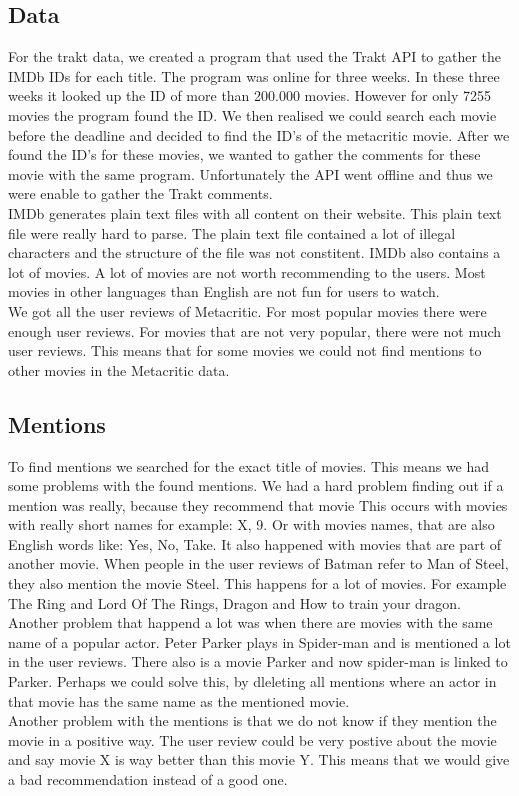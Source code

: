 \subsection{Data}
For the trakt data, we created a program that used the Trakt API to gather the IMDb IDs for each title.
The program was online for three weeks. 
In these three weeks it looked up the ID of more than 200.000 movies. 
However for only 7255 movies the program found the ID.
We then realised we could search each movie before the deadline and decided to find the ID's of the metacritic movie.
After we found the ID's for these movies, we wanted to gather the comments for these movie with the same program.
Unfortunately the API went offline and thus we were enable to gather the Trakt comments. \\

IMDb generates plain text files with all content on their website.
This plain text file were really hard to parse.
The plain text file contained a lot of illegal characters and the structure of the file was not constitent. 
IMDb also contains a lot of movies. 
A lot of movies are not worth recommending to the users.
Most movies in other languages than English are not fun for users to watch. \\

We got all the user reviews of Metacritic. For most popular movies there were enough user reviews.
For movies that are not very popular, there were not much user reviews.
This means that for some movies we could not find mentions to other movies in the Metacritic data.

\subsection{Mentions}
To find mentions we searched for the exact title of movies. 
This means we had some problems with the found mentions.
We had a hard problem finding out if a mention was really, because they recommend that movie
This occurs with movies with really short names for example: X, 9. 
Or with movies names, that are also English words like: Yes, No, Take.
It also happened with movies that are part of another movie. 
When people in the user reviews of Batman refer to Man of Steel, they also mention the movie Steel.
This happens for a lot of movies. 
For example The Ring and Lord Of The Rings, Dragon and How to train your dragon. 
Another problem that happend a lot was when there are movies with the same name of a popular actor.
Peter Parker plays in Spider-man and is mentioned a lot in the user reviews. 
There also is a movie Parker and now spider-man is linked to Parker.
Perhaps we could solve this, by dleleting all mentions where an actor in that movie has the same name as the mentioned movie. \\

Another problem with the mentions is that we do not know if they mention the movie in a positive way. 
The user review could be very postive about the movie and say movie X is way better than this movie Y.
This means that we would give a bad recommendation instead of a good one. 

